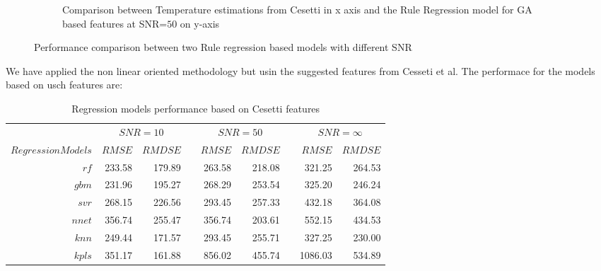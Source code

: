 \begin {figure}
\begin{subfigure}{.85\textwidth}
  \caption{Comparison between Temperature estimations from Cesetti 
 in x axis and the Rule Regression model for GA based features 
 at SNR=$50$ on y-axis}
 \label{fig:ga_rr50ga_spt}
 \end{subfigure} 
 \label {fig:comp02}
 \caption{Performance comparison between two Rule regression based models with different SNR}
\end {figure}
%
%

%
% 


%


We have applied the non linear oriented methodology but usin the suggested features from Cesseti et al.
The performace for the models based on usch features are:

\begin{table}\centering
{}
\begin{tabular}{@{}rrrcrrcrr@{}}\toprule
& \multicolumn{2}{c}{$SNR = 10$} & \phantom{ab}& \multicolumn{2}{c}{$SNR = 50$} &
\phantom{ab} & \multicolumn{2}{c}{$SNR = \infty$}\\
\cmidrule{2-3} \cmidrule{5-6} \cmidrule{8-9}

$Regression Models$ & $RMSE$ & $RMDSE$ && $RMSE$ & $RMDSE$ && $RMSE$ & $RMDSE$ \\ \midrule
$rf $               & 233.58 & 179.89 && 263.58 & 218.08 && 321.25 & 264.53 \\
$ gbm $              & 231.96 & 195.27 && 268.29 & 253.54 && 325.20 & 246.24 \\
$ svr $             & 268.15 & 226.56 && 293.45 & 257.33 && 432.18 & 364.08 \\
$ nnet $            & 356.74 & 255.47 && 356.74 & 203.61 && 552.15 & 434.53 \\
$ knn $             & 249.44 & 171.57 && 293.45 & 255.71 && 327.25 & 230.00  \\
$ kpls $            & 351.17 & 161.88 && 856.02 & 455.74 && 1086.03 & 534.89 \\

\hline
\end{tabular}
\caption {Regression models performance based on Cesetti features} 
\label{tab:tab_CS_Model}
\end{table}



